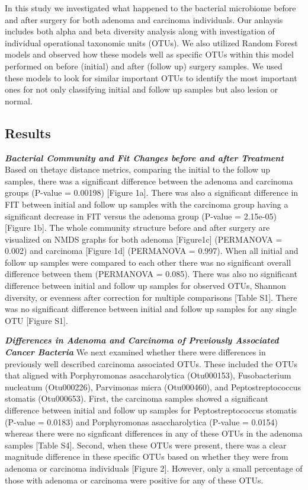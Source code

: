 \documentclass[12pt,]{article}
\begin{document}
In this study we investigated what happened to the bacterial microbiome
before and after surgery for both adenoma and carcinoma individuals. Our
anlaysis includes both alpha and beta diversity analysis along with
investigation of individual operational taxonomic units (OTUs). We also
utilized Random Forest models and observed how these models well as
specific OTUs within this model performed on before (initial) and after
(follow up) surgery samples. We used these models to look for similar
important OTUs to identify the most important ones for not only
classifying initial and follow up samples but also lesion or normal.

\newpage

\subsection{Results}\label{results}

\textbf{\emph{Bacterial Community and Fit Changes before and after
Treatment}} Based on thetayc distance metrics, comparing the initial to
the follow up samples, there was a significant difference between the
adenoma and carcinoma groups (P-value = 0.00198) {[}Figure 1a{]}. There
was also a significant difference in FIT between initial and follow up
samples with the carcinoma group having a significant decrease in FIT
versus the adenoma group (P-value = 2.15e-05) {[}Figure 1b{]}. The whole
community structure before and after surgery are visualized on NMDS
graphs for both adenoma {[}Figure1c{]} (PERMANOVA = 0.002) and carcinoma
{[}Figure 1d{]} (PERMANOVA = 0.997). When all initial and follow up
samples were compared to each other there was no significant overall
difference between them (PERMANOVA = 0.085). There was also no
significant difference between initial and follow up samples for
observed OTUs, Shannon diversity, or evenness after correction for
multiple comparisons {[}Table S1{]}. There was no significant difference
between initial and follow up samples for any single OTU {[}Figure
S1{]}.

\textbf{\emph{Differences in Adenoma and Carcinoma of Previously
Associated Cancer Bacteria}} We next examined whether there were
differences in previously well described carcinoma associated OTUs.
These included the OTUs that aligned with Porphyromonas asaccharolytica
(Otu000153), Fusobacterium nucleatum (Otu000226), Parvimonas micra
(Otu000460), and Peptostreptococcus stomatis (Otu000653). First, the
carcinoma samples showed a significant difference between initial and
follow up samples for Peptostreptococcus stomatis (P-value = 0.0183) and
Porphyromonas asaccharolytica (P-value = 0.0154) whereas there were no
signficant differences in any of these OTUs in the adenoma samples
{[}Table S4{]}. Second, when these OTUs were present, there was a clear
magnitude difference in these specific OTUs based on whether they were
from adenoma or carcinoma individuals {[}Figure 2{]}. However, only a
small percentage of those with adenoma or carcinoma were positive for
any of these OTUs.
\end{document}
